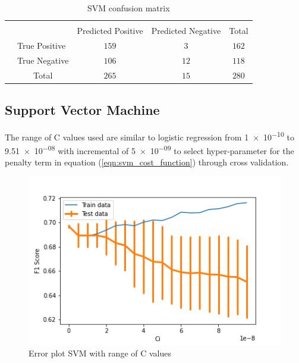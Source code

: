 \documentclass[transmag]{IEEEtran}
\begin{document}
\begin{table}[h]
\begin{center}
\begin{tabular}{l|l|c|c|c}
\multicolumn{2}{c}{}&\multicolumn{2}{c}{}&\\
\cline{3-4}
\multicolumn{2}{c|}{}& Predicted Positive & Predicted Negative &\multicolumn{1}{c}{Total}\\
\cline{2-4}
\multirow{2}{*}{}& True Positive & $159$ & $3$ & $162$\\
\cline{2-4}
& True Negative & $106$ & $12$ & $118$\\
\cline{2-4}
\multicolumn{1}{c}{} & \multicolumn{1}{c}{Total} & \multicolumn{1}{c}{$265$} & \multicolumn{    1}{c}{$15$} & \multicolumn{1}{c}{$280$}\\
\end{tabular}
\end{center}
\caption{SVM confusion matrix} 
\label{table:confusion_svm}
\end{table}


\subsection{Support Vector Machine}
\noindent The range of C values used are similar to logistic regression from \num{1e-10} to \num{9.51e-08} with incremental of \num{5e-09} to select hyper-parameter for the penalty term in equation (\ref{eqn:svm_cost_function}) through cross validation.

\begin{figure}[h]
	\includegraphics[width=\columnwidth]{svm_cv_ci.png} 
    \caption{Error plot SVM with range of C values}%
    \label{fig:svm_c}%
\end{figure}
\end{document}
